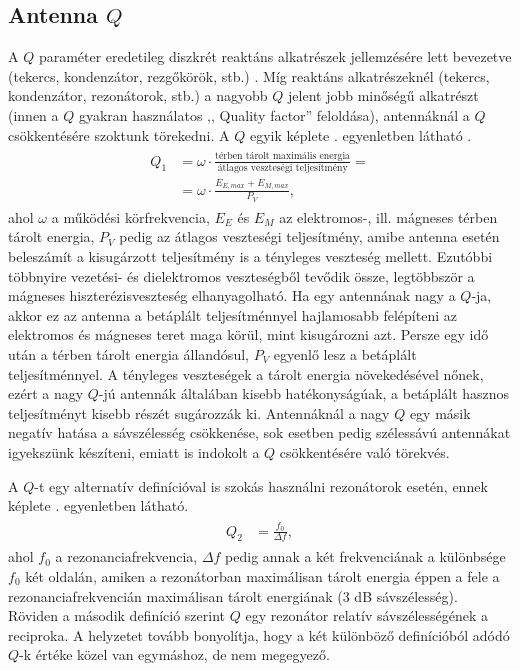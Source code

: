 		\subsection{Antenna $Q$}
		A $Q$ paraméter eredetileg diszkrét reaktáns alkatrészek jellemzésére lett bevezetve (tekercs, kondenzátor, rezgőkörök, stb.) \cite{story-of-q}. Míg reaktáns alkatrészeknél (tekercs, kondenzátor, rezonátorok, stb.) a nagyobb $Q$ jelent jobb minőségű alkatrészt (innen a $Q$ gyakran használatos ,, Quality factor'' feloldása), antennáknál a $Q$ csökkentésére szoktunk törekedni. A $Q$ egyik képlete . egyenletben látható \cite{multi-band}.
		\begin{align}
			\begin{split}\label{equ:Q}
				Q_1 & = \omega \cdot \frac{\text{térben tárolt maximális energia}}{\text{átlagos veszteségi teljesítmény}} = \\
				& = \omega \cdot \frac{E_{E, max}+E_{M, max}}{P_V},
			\end{split}
		\end{align}
		ahol $\omega$ a működési körfrekvencia, $E_E$ és $E_M$ az elektromos-, ill. mágneses térben tárolt energia, $P_V$ pedig az átlagos veszteségi teljesítmény, amibe antenna esetén beleszámít a kisugárzott teljesítmény is a tényleges veszteség mellett. Ezutóbbi többnyire vezetési- és dielektromos veszteségből tevődik össze, legtöbbször a mágneses hiszterézisveszteség elhanyagolható. Ha egy antennának nagy a $Q$-ja, akkor ez az antenna a betáplált teljesítménnyel hajlamosabb felépíteni az elektromos és mágneses teret maga körül, mint kisugározni azt. Persze egy idő után a térben tárolt energia állandósul, $P_V$ egyenlő lesz a betáplált teljesítménnyel. A tényleges veszteségek a tárolt energia növekedésével nőnek, ezért a nagy $Q$-jú antennák általában kisebb hatékonyságúak, a betáplált hasznos teljesítményt kisebb részét sugározzák ki. Antennáknál a nagy $Q$ egy másik negatív hatása a sávszélesség csökkenése, sok esetben pedig szélessávú antennákat igyekszünk készíteni, emiatt is indokolt a $Q$ csökkentésére való törekvés.
		\par A $Q$-t egy alternatív definícióval is szokás használni rezonátorok esetén, ennek képlete . egyenletben látható.
		\begin{align}
			\begin{split}\label{equ:Q2}
				Q_2 & = \frac{f_0}{\Delta f},
			\end{split}
		\end{align}
		ahol $f_0$ a rezonanciafrekvencia, $\Delta f$ pedig annak a két frekvenciának a különbsége $f_0$ két oldalán, amiken a rezonátorban maximálisan tárolt energia éppen a fele a rezonanciafrekvencián maximálisan tárolt energiának (3 dB sávszélesség). Röviden a második definíció szerint $Q$ egy rezonátor relatív sávszélességének a reciproka. A helyzetet tovább bonyolítja, hogy a két különböző definícióból adódó $Q$-k értéke közel van egymáshoz, de nem megegyező.
